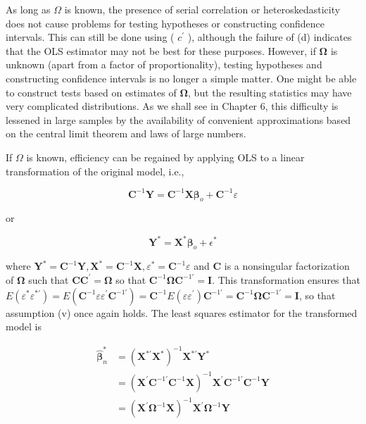 \documentclass[10pt]{article}
\begin{document}
As long as $\Omega$ is known, the presence of serial correlation or heteroskedasticity does not cause problems for testing hypotheses or constructing confidence intervals. This can still be done using ( $c^{\prime}$ ), although the failure of (d) indicates that the OLS estimator may not be best for these purposes. However, if $\boldsymbol{\Omega}$ is unknown (apart from a factor of proportionality), testing hypotheses and constructing confidence intervals is no longer a simple matter. One might be able to construct tests based on estimates of $\boldsymbol{\Omega}$, but the resulting statistics may have very complicated distributions. As we shall see in Chapter 6, this difficulty is lessened in large samples by the availability of convenient approximations based on the central limit theorem and laws of large numbers.

If $\Omega$ is known, efficiency can be regained by applying OLS to a linear transformation of the original model, i.e.,

$$
\mathbf{C}^{-1} \mathbf{Y}=\mathbf{C}^{-1} \mathbf{X} \boldsymbol{\beta}_{o}+\mathbf{C}^{-1} \varepsilon
$$

or

$$
\mathbf{Y}^{*}=\mathbf{X}^{*} \boldsymbol{\beta}_{o}+\epsilon^{*}
$$

where $\mathbf{Y}^{*}=\mathbf{C}^{-1} \mathbf{Y}, \mathbf{X}^{*}=\mathbf{C}^{-1} \mathbf{X}, \varepsilon^{*}=\mathbf{C}^{-1} \varepsilon$ and $\mathbf{C}$ is a nonsingular factorization of $\boldsymbol{\Omega}$ such that $\mathbf{C C}^{\prime}=\boldsymbol{\Omega}$ so that $\mathbf{C}^{-1} \boldsymbol{\Omega} \mathbf{C}^{-1 \prime}=\mathbf{I}$. This transformation ensures that $E\left(\varepsilon^{*} \varepsilon^{* \prime}\right)=E\left(\mathbf{C}^{-1} \varepsilon \varepsilon^{\prime} \mathbf{C}^{-1 \prime}\right)=\mathbf{C}^{-1} E\left(\varepsilon \varepsilon^{\prime}\right) \mathbf{C}^{-1 \prime}= \mathbf{C}^{-1} \boldsymbol{\Omega} \mathbf{C}^{-1 \prime}=\mathbf{I}$, so that assumption (v) once again holds. The least squares estimator for the transformed model is

$$
\begin{aligned}
\hat{\boldsymbol{\beta}}_{n}^{*} & =\left(\mathbf{X}^{* \prime} \mathbf{X}^{*}\right)^{-1} \mathbf{X}^{* \prime} \mathbf{Y}^{*} \\
& =\left(\mathbf{X}^{\prime} \mathbf{C}^{-1 \prime} \mathbf{C}^{-1} \mathbf{X}\right)^{-1} \mathbf{X}^{\prime} \mathbf{C}^{-1 \prime} \mathbf{C}^{-1} \mathbf{Y} \\
& =\left(\mathbf{X}^{\prime} \mathbf{\Omega}^{-1} \mathbf{X}\right)^{-1} \mathbf{X}^{\prime} \mathbf{\Omega}^{-1} \mathbf{Y}
\end{aligned}
$$
\end{document}
